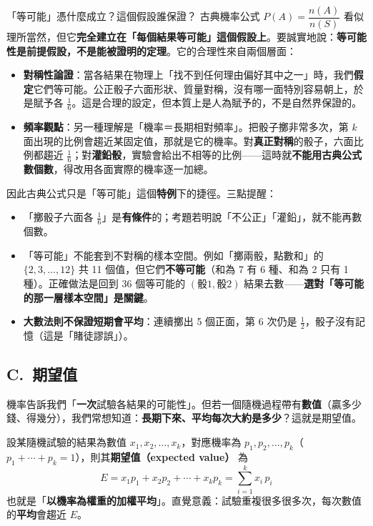 \documentclass[11pt]{article}
\begin{document}
\begin{延伸框}{「等可能」憑什麼成立？這個假設誰保證？}
古典機率公式 $P(A)=\dfrac{n(A)}{n(S)}$ 看似理所當然，但它\textbf{完全建立在「每個結果等可能」這個假設上}。要誠實地說：\textbf{等可能性是前提假設，不是能被證明的定理}。它的合理性來自兩個層面：

\begin{itemize}\setlength{\itemsep}{1pt}
\item \textbf{對稱性論證}：當各結果在物理上「找不到任何理由偏好其中之一」時，我們\textbf{假定}它們等可能。公正骰子六面形狀、質量對稱，沒有哪一面特別容易朝上，於是賦予各 $\tfrac16$。這是合理的設定，但本質上是人為賦予的，不是自然界保證的。
\item \textbf{頻率觀點}：另一種理解是「機率＝長期相對頻率」。把骰子擲非常多次，第 $k$ 面出現的比例會趨近某固定值，那就是它的機率。對\textbf{真正對稱}的骰子，六面比例都趨近 $\tfrac16$；對\textbf{灌鉛骰}，實驗會給出不相等的比例——這時就\textbf{不能用古典公式數個數}，得改用各面實際的機率逐一加總。
\end{itemize}

因此古典公式只是「等可能」這個\textbf{特例}下的捷徑。三點提醒：
\begin{itemize}\setlength{\itemsep}{1pt}
\item 「擲骰子六面各 $\tfrac16$」是\textbf{有條件}的；考題若明說「不公正」「灌鉛」，就不能再數個數。
\item 「等可能」不能套到不對稱的樣本空間。例如「擲兩骰，點數和」的 $\{2,3,\dots,12\}$ 共 11 個值，但它們\textbf{不等可能}（和為 7 有 6 種、和為 2 只有 1 種）。正確做法是回到 $36$ 個等可能的 $(\text{骰}1,\text{骰}2)$ 結果去數——\textbf{選對「等可能的那一層樣本空間」是關鍵}。
\item \textbf{大數法則不保證短期會平均}：連續擲出 5 個正面，第 6 次仍是 $\tfrac12$，骰子沒有記憶（這是「賭徒謬誤」）。
\end{itemize}
\end{延伸框}

\subsection*{\sffamily C.\ 期望值}

機率告訴我們「\textbf{一次}試驗各結果的可能性」。但若一個隨機過程帶有\textbf{數值}（贏多少錢、得幾分），我們常想知道：\textbf{長期下來、平均每次大約是多少}？這就是期望值。

設某隨機試驗的結果為數值 $x_1,x_2,\dots,x_k$，對應機率為 $p_1,p_2,\dots,p_k$（$p_1+\cdots+p_k=1$），則其\textbf{期望值（expected value）} 為
$$\boxed{\,E = x_1 p_1 + x_2 p_2 + \cdots + x_k p_k = \sum_{i=1}^{k} x_i\,p_i\,}$$
也就是「\textbf{以機率為權重的加權平均}」。直覺意義：試驗重複很多很多次，每次數值的\textbf{平均}會趨近 $E$。
\end{document}
